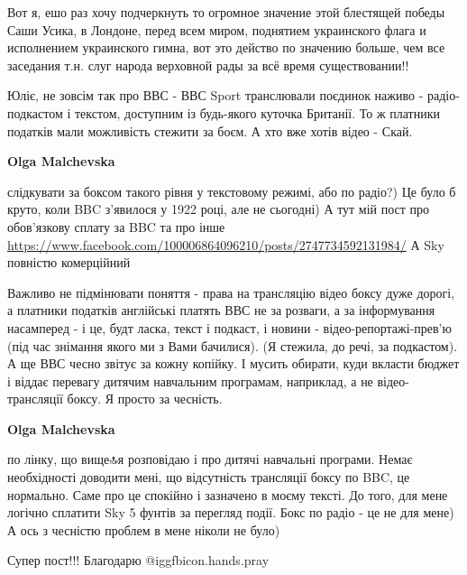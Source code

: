 \begin{itemize}

Вот я, ешо раз хочу подчеркнуть то огромное значение этой блестящей победы Саши
Усика, в Лондоне, перед всем миром, поднятием украинского флага и исполнением
украинского гимна, вот это действо по значению больше, чем все заседания т.н.
слуг народа верховной рады за всё время существовании!!


Юліє, не зовсім так про ВВС - ВВС Sport транслювали поєдинок наживо -
радіо-подкастом і текстом, доступним із будь-якого куточка Британії. То ж
платники податків мали можливість стежити за боєм. А хто вже хотів відео -
Скай.


\begin{itemize} %
\textbf{Olga Malchevska} 

слідкувати за боксом такого рівня у текстовому режимі, або по радіо?) Це було б
круто, коли BBC з'явилося у 1922 році, але не сьогодні) А тут мій пост про
обов'язкову сплату за BBC та про інше
\url{https://www.facebook.com/100006864096210/posts/2747734592131984/} А Sky повністю
комерційний



Важливо не підмінювати поняття - права на трансляцію відео боксу дуже дорогі, а
платники податків англійські платять ВВС не за розваги, а за інформування
насамперед - і це, будт ласка, текст і подкаст, і новини -
відео-репортажі-прев’ю (під час знімання якого ми з Вами бачилися). (Я стежила,
до речі, за подкастом). А ще ВВС чесно звітує за кожну копійку. І мусить
обирати, куди вкласти бюджет і віддає перевагу дитячим навчальним програмам,
наприклад, а не відео-трансляції боксу. Я просто за чесність.


\textbf{Olga Malchevska} 

по лінку, що вище🔝я розповідаю і про дитячі навчальні програми. Немає
необхідності доводити мені, що відсутність трансляції боксу по BBC, це
нормально. Саме про це спокійно і зазначено в моєму тексті. До того, для мене
логічно сплатити Sky 5 фунтів за перегляд події. Бокс по радіо - це не для
мене) А ось з чесністю проблем в мене ніколи не було)

\end{itemize} %

Супер пост!!!
Благодарю  @igg{fbicon.hands.pray} 



\end{itemize}
